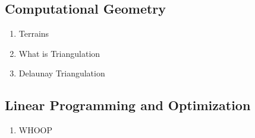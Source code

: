 \subsection{Computational Geometry}
\begin{enumerate}
  \item Terrains
  \item What is Triangulation
  \item Delaunay Triangulation
\end{enumerate}
\newpage

\subsection{Linear Programming and Optimization}
\begin{enumerate}
  \item WHOOP
\end{enumerate}
\newpage